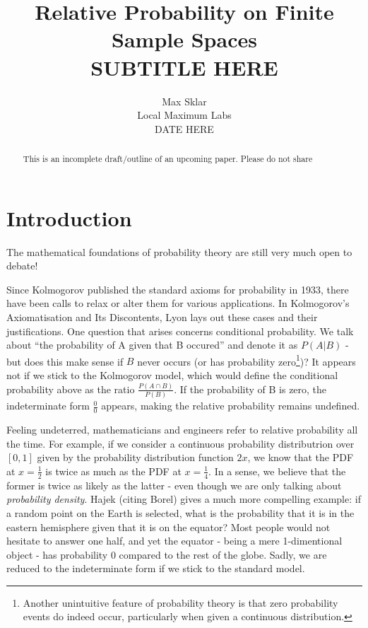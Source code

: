 \documentclass[twoside]{article}
\newcommand{\quotes}[1]{``#1''}
\theoremstyle{plain}%
\theoremstyle{definition}
\theoremstyle{remark}
\begin{document}
\parindent=0in
\parskip=12pt


\title{
  Relative Probability on Finite Sample Spaces \\
  \large{
    SUBTITLE HERE
  }
}

\author{Max Sklar\\ Local Maximum Labs \\ DATE HERE}
\date{}

\maketitle
\thispagestyle{empty}

\begin{abstract}
This is an incomplete draft/outline of an upcoming paper. Please do not share
\end{abstract}

\tableofcontents
\newpage

\section{Introduction}

The mathematical foundations of probability theory are still very much open to debate!

Since Kolmogorov published the standard axioms for probability in 1933\cite{kolmogorov}, there have been calls to relax or alter them for various applications. In Kolmogorov's Axiomatisation and Its Discontents\cite{lyon}, Lyon lays out these cases and their justifications.
One question that arises concerns conditional probability. We talk about \quotes{the probability of A given that B occured} and denote it as \(P(A|B)\) - but does this make sense if \(B\) never occurs (or has probability zero\footnote{Another unintuitive feature of probability theory is that zero probability events do indeed occur, particularly when given a continuous distribution.})? It appears not if we stick to the Kolmogorov model, which would define the conditional probability above as the ratio \(\frac{P(A \cap B)}{P(B)}\). If the probability of B is zero, the indeterminate form \(\frac{0}{0}\) appears, making the relative probability remains undefined.

Feeling undeterred, mathematicians and engineers refer to relative probability all the time. For example, if we consider a continuous probability distributrion over \([0, 1]\) given by the probability distribution function \(2x\), we know that the PDF at \(x = \frac{1}{2}\) is twice as much as the PDF at \(x = \frac{1}{4}\). In a sense, we believe that the former is twice as likely as the latter - even though we are only talking about \textit{probability density}. Hajek\cite{hajek} (citing Borel) gives a much more compelling example: if a random point on the Earth is selected, what is the probability that it is in the eastern hemisphere given that it is on the equator? Most people would not hesitate to answer one half, and yet the equator - being a mere 1-dimentional object - has probability 0 compared to the rest of the globe. Sadly, we are reduced to the indeterminate form if we stick to the standard model.
\end{document}

